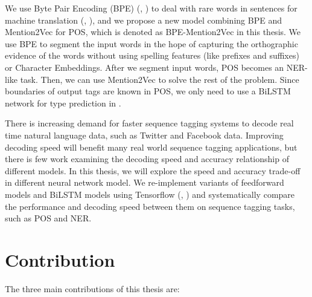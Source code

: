 We use Byte Pair Encoding (BPE) (\citeauthor{gage1994new}, \citeyear{gage1994new}) to deal with rare words in sentences for machine translation (\citeauthor{sennrich2015neural}, \citeyear{sennrich2015neural}), and we propose a new model combining BPE and Mention2Vec for POS, which is denoted as BPE-Mention2Vec in this thesis. We use BPE to segment the input words in the hope of capturing the orthographic evidence of the words without using spelling features (like prefixes and suffixes) or Character Embeddings. After we segment input words, POS becomes an NER-like task. Then, we can use Mention2Vec to solve the rest of the problem. Since boundaries of output tags are known in POS, we only need to use a BiLSTM network for type prediction in \mb.

There is increasing demand for faster sequence tagging systems to decode real time natural language data, such as Twitter and Facebook data. Improving decoding speed will benefit many real world sequence tagging applications, but there is few work examining the decoding speed and accuracy relationship of different models. In this thesis, we will explore the speed and accuracy trade-off in different neural network model. We re-implement variants of feedforward models and BiLSTM models using Tensorflow (\citeauthor{abadi2016tensorflow}, \citeyear{abadi2016tensorflow}) and systematically compare the performance and decoding speed between them on sequence tagging tasks, such as POS and NER.

\section{Contribution}
The three main contributions of this thesis are:

